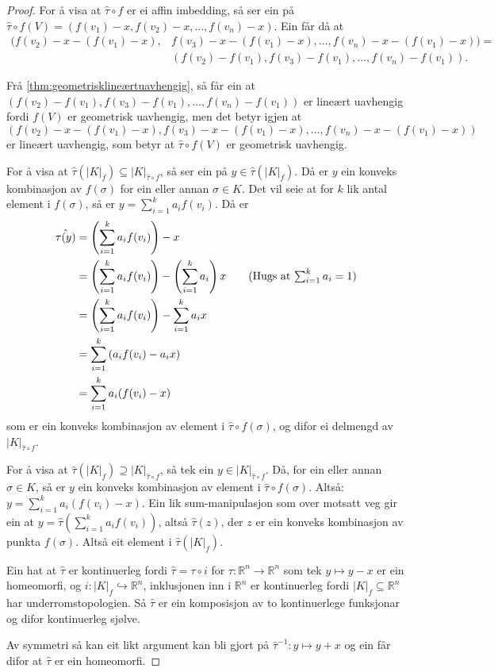 \documentclass[a4paper, 12pt, norsk]{article}
\theoremstyle{plain}
\theoremstyle{definition}
\newcommand{\Rb}{\mathbb{R}}
\newcommand{\gr}[1]{ \lvert #1 \rvert } %
\newcommand{\tuple}[1]{ \left( #1 \right) } %
\begin{document}
\begin{proof}
	For å visa at \( \hat{\tau} \circ f \) er ei affin imbedding, så ser ein på \( \hat{\tau} \circ f(V) = (f(v_1)-x, f(v_2)-x, \dots, f(v_n)-x) \). Ein får då at 
	\begin{align*}
		(f(v_2)-x-(f(v_1)-x), &f(v_3)-x-(f(v_1)-x), \dots, f(v_n)-x-(f(v_1)-x)) = \\
		&( f(v_2)-f(v_1), f(v_3)-f(v_1), \dots, f(v_n)-f(v_1) ) .
	\end{align*}

	Frå \autoref{thm:geometrisklineærtuavhengig}, så får ein at \( ( f(v_2)-f(v_1), f(v_3)-f(v_1), \dots, f(v_n)-f(v_1) ) \) er lineært uavhengig fordi \( f(V) \) er geometrisk uavhengig, men det betyr igjen at \( (f(v_2)-x-(f(v_1)-x), f(v_3)-x-(f(v_1)-x), \dots, f(v_n)-x-(f(v_1)-x)) \) er lineært uavhengig, som betyr at \( \hat{\tau} \circ f(V) \) er geometrisk uavhengig.

	For å visa at \( \hat{\tau}(\gr{K}_f) \subseteq \gr{K}_{\hat{\tau} \circ f} \), så ser ein på \( y \in \hat{\tau}(\gr{K}_f) \). Då er \( y \) ein konveks kombinasjon av \( f(\sigma) \) for ein eller annan \( \sigma \in K \). Det vil seie at for \( k \) lik antal element i \( f(\sigma) \), så er \( y = \sum_{i=1}^k a_i f(v_i) \). Då er
	\begin{align*}
		\hat{\tau(y)} &= \left(\sum_{i=1}^k a_i f(v_i)\right) - x \\
		&= \left(\sum_{i=1}^k a_i f(v_i)\right)-\left(\sum_{i=1}^k a_i \right)x 
		\tag{Hugs at \( \sum_{i=1}^k a_i = 1 \)} \\
		&= \left(\sum_{i=1}^k a_i f(v_i)\right)-\sum_{i=1}^k a_i x \\
		&= \sum_{i=1}^k \tuple{a_i f(v_i) - a_i x} \\
		&= \sum_{i=1}^k a_i(f(v_i) - x)
	\end{align*}
	som er ein konveks kombinasjon av element i \( \hat{\tau} \circ f(\sigma) \), og difor ei delmengd av \( \gr{K}_{\hat{\tau} \circ f} \).

	For å visa at \( \hat{\tau}(\gr{K}_f) \supseteq \gr{K}_{\hat{\tau} \circ f} \), så tek ein \( y \in \gr{K}_{\hat{\tau} \circ f} \). Då, for ein eller annan \( \sigma \in K \), så er \( y \) ein konveks kombinasjon av element i \( \hat{\tau}\circ f(\sigma) \). Altså: \(  y = \sum_{i=1}^k a_i (f(v_i) - x) \). Ein lik sum-manipulasjon som over motsatt veg gir ein at \( y = \hat{\tau}\left(\sum_{i=1}^k a_i f(v_i)\right) \), altså \( \hat{\tau}(z) \), der \( z \) er ein konveks kombinasjon av punkta \( f(\sigma) \). Altså eit element i \( \hat{\tau}(\gr{K}_f) \).

	Ein hat at \( \hat{\tau} \) er kontinuerleg fordi \( \hat{\tau} = \tau \circ i \) for \( \tau: \Rb^n \to \Rb^n \) som tek \( y \mapsto y-x \) er ein homeomorfi, og \( i: \gr{K}_f \hookrightarrow \Rb^n \), inklusjonen inn i \( \Rb^n \) er kontinuerleg fordi \( \gr{K}_f \subseteq \Rb^n \) har underromstopologien. Så \( \hat{\tau} \) er ein komposisjon av to kontinuerlege funksjonar og difor kontinuerleg sjølve.

	Av symmetri så kan eit likt argument kan bli gjort på \( \hat{\tau}^{-1}: y \mapsto y+x \) og ein får difor at \( \hat{\tau} \) er ein homeomorfi.
\end{proof}
\end{document}
